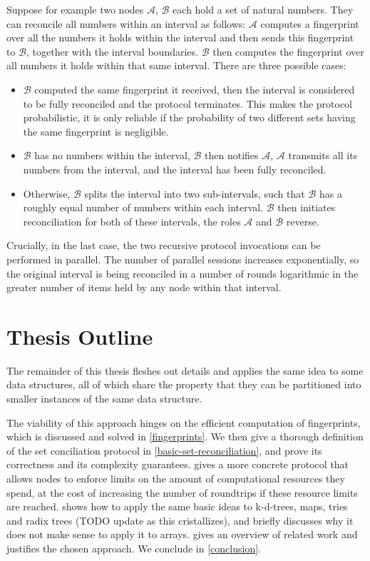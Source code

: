 Suppose for example two nodes $\mathcal{A}$, $\mathcal{B}$ each hold a set of natural numbers.
They can reconcile all numbers within an interval as follows: $\mathcal{A}$ computes
a fingerprint over all the numbers it holds within the interval and then sends this
fingerprint to $\mathcal{B}$, together with the interval boundaries. $\mathcal{B}$ then computes
the fingerprint over all numbers it holds within that same interval. There
are three possible cases:

\begin{itemize}
\item
  $\mathcal{B}$ computed the same fingerprint it received, then the interval is considered to be fully reconciled and the protocol terminates. This makes the protocol probabilistic, it is only reliable if the probability of two different sets having the same fingerprint is negligible.
\item
  $\mathcal{B}$ has no numbers within the interval, $\mathcal{B}$ then notifies $\mathcal{A}$, $\mathcal{A}$
  transmits all its numbers from the interval, and the interval has been
  fully reconciled.
\item
  Otherwise, $\mathcal{B}$ splits the interval into two sub-intervals, such that $\mathcal{B}$
  has a roughly equal number of numbers within each interval. $\mathcal{B}$ then
  initiates reconciliation for both of these intervals, the roles $\mathcal{A}$ and
  $\mathcal{B}$ reverse.
\end{itemize}

Crucially, in the last case, the two recursive protocol invocations can
be performed in parallel. The number of parallel sessions increases
exponentially, so the original interval is being reconciled in a number
of rounds logarithmic in the greater number of items held by any node
within that interval.

\section{Thesis Outline}

The remainder of this thesis fleshes out details and applies the same
idea to some data structures, all of which share the property that they can be partitioned into smaller instances of the same data structure.

The viability of this approach
hinges on the efficient computation of fingerprints, which is discussed
and solved in \cref{fingerprints}. We then give a thorough definition of the set
conciliation protocol in \cref{basic-set-reconciliation}, and prove its correctness and its
complexity guarantees.  gives a more concrete protocol that
allows nodes to enforce limits on the amount of computational resources
they spend, at the cost of increasing the number of roundtrips if these
resource limits are reached.  shows how to apply the same basic
ideas to k-d-trees, maps, tries and radix trees (TODO update as this cristallizes), and briefly discusses
why it does not make sense to apply it to arrays. 
gives an overview of related work and justifies the chosen approach. We
conclude in \cref{conclusion}.